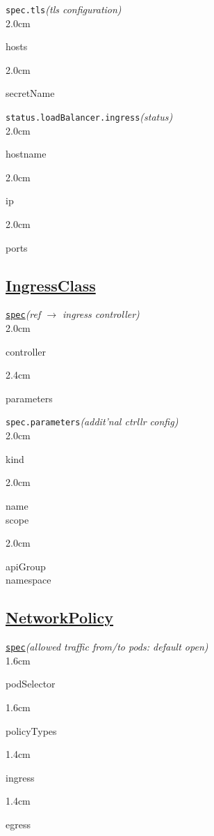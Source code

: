 \texttt{spec.tls}\quad\textit{(tls configuration)}\\[-2mm]
\api
{2.0cm}{
hosts

}
{2.0cm}{
secretName

}
\stopapi


\texttt{status.loadBalancer.ingress}\quad\textit{(status)}\\[-2mm]
\api
{2.0cm}{
hostname

}
{2.0cm}{
ip

}
{2.0cm}{
ports

}
\stopapi



\subsection*{\href{https://kubernetes.io/docs/concepts/services-networking/ingress/\#ingress-class}{IngressClass}}


\texttt{\href{https://kubernetes.io/docs/reference/kubernetes-api/service-resources/ingress-class-v1/}{spec}}\quad\textit{(ref $\to$ ingress controller)}\\[-2mm]
\api
{2.0cm}{
controller

}
{2.4cm}{
parameters

}
\stopapi


\texttt{spec.parameters}\quad\textit{(addit'nal ctrllr config)}\\[-2mm]
\api
{2.0cm}{
kind

}
{2.0cm}{
name            \\
scope

}
{2.0cm}{
apiGroup        \\
namespace

}
\stopapi



\subsection*{\href{https://kubernetes.io/docs/concepts/services-networking/network-policies/}{NetworkPolicy}}

\texttt{\href{https://kubernetes.io/docs/reference/kubernetes-api/policy-resources/network-policy-v1/}{spec}}\quad\textit{(allowed traffic from/to pods: default open)}\\[-2mm]
\api
{1.6cm}{
podSelector

}
{1.6cm}{
policyTypes

}
{1.4cm}{
ingress     

}
{1.4cm}{
egress

}
\stopapi


